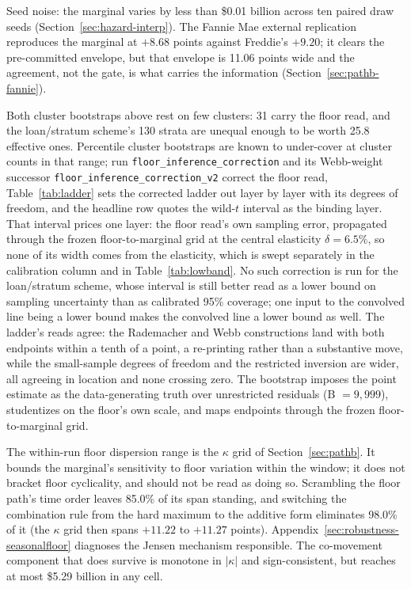 \documentclass[12pt]{article}
\begin{document}
\begin{table}[!tp]
\begin{threeparttable}
\begin{tabular}{@{}>{\raggedright\arraybackslash}p{2.2cm}>{\raggedright\arraybackslash}p{3.0cm}>{\raggedright\arraybackslash}p{3.8cm}>{\raggedright\arraybackslash}p{5.0cm}@{}}
\bottomrule
\end{tabular}
\begin{tablenotes}[flushleft]\footnotesize
\item Seed noise: the marginal varies by less than \$0.01 billion across ten paired draw seeds (Section~\ref{sec:hazard-interp}). The Fannie Mae external replication reproduces the marginal at $+8.68$ points against Freddie's $+9.20$; it clears the pre-committed envelope, but that envelope is 11.06 points wide and the agreement, not the gate, is what carries the information (Section~\ref{sec:pathb-fannie}).
\item Both cluster bootstraps above rest on few clusters: 31 carry the floor read, and the loan/stratum scheme's 130 strata are unequal enough to be worth 25.8 effective ones. Percentile cluster bootstraps are known to under-cover at cluster counts in that range; run \texttt{floor\_inference\_correction} and its Webb-weight successor \texttt{floor\_inference\_correction\_v2} correct the floor read, Table~\ref{tab:ladder} sets the corrected ladder out layer by layer with its degrees of freedom, and the headline row quotes the wild-$t$ interval as the binding layer. That interval prices one layer: the floor read's own sampling error, propagated through the frozen floor-to-marginal grid at the central elasticity $\delta = 6.5\%$, so none of its width comes from the elasticity, which is swept separately in the calibration column and in Table~\ref{tab:lowband}. No such correction is run for the loan/stratum scheme, whose interval is still better read as a lower bound on sampling uncertainty than as calibrated 95\% coverage; one input to the convolved line being a lower bound makes the convolved line a lower bound as well. The ladder's reads agree: the Rademacher and Webb constructions land with both endpoints within a tenth of a point, a re-printing rather than a substantive move, while the small-sample degrees of freedom and the restricted inversion are wider, all agreeing in location and none crossing zero. The bootstrap imposes the point estimate as the data-generating truth over unrestricted residuals (B $= 9{,}999$), studentizes on the floor's own scale, and maps endpoints through the frozen floor-to-marginal grid.
\item The within-run floor dispersion range is the $\kappa$ grid of Section~\ref{sec:pathb}. It bounds the marginal's sensitivity to floor variation within the window; it does not bracket floor cyclicality, and should not be read as doing so. Scrambling the floor path's time order leaves 85.0\% of its span standing, and switching the combination rule from the hard maximum to the additive form eliminates 98.0\% of it (the $\kappa$ grid then spans $+11.22$ to $+11.27$ points). Appendix~\ref{sec:robustness-seasonalfloor} diagnoses the Jensen mechanism responsible. The co-movement component that does survive is monotone in $|\kappa|$ and sign-consistent, but reaches at most \$5.29 billion in any cell.

\end{tablenotes}
\end{threeparttable}
\end{table}
\end{document}
